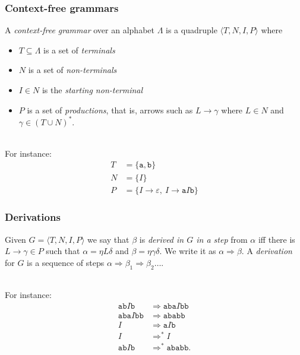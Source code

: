 \documentclass[11pt]{beamer}  %
\begin{document}
\begin{frame}\frametitle{Context-free grammars}

\begin{greenbox}{}
A \emph{context-free grammar} over an alphabet $\Lambda$
is a quadruple $\langle T,N,I,P\rangle$ where
\begin{itemize}
\item $T\subseteq\Lambda$
      is a set of \emph{terminals}
\item $N$ is a set of \emph{non-terminals}
\item $I\in N$ is the \emph{starting non-terminal}
\item $P$ is a set of \emph{productions}, that is, arrows such as
      $L\to\gamma$ where $L\in N$ and $\gamma\in (T\cup N)^*$.
\end{itemize}
\end{greenbox}

\mbox{}\\

For instance:
%
\[
\begin{split}
  T &= \{\mathtt{a},\mathtt{b}\}\\
  N &= \{I\}\\
  P &= \{I\to\varepsilon,\ I\to\mathtt{a}I\mathtt{b}\}
\end{split}
\]

\end{frame}

\begin{frame}\frametitle{Derivations}

\begin{greenbox}{}
Given $G=\langle T,N,I,P\rangle$ we say that
$\beta$ is
\emph{derived in $G$ in a step}
from $\alpha$ iff there is
$L\to\gamma\in P$ such that $\alpha=\eta L\delta$ and $\beta=\eta\gamma\delta$.
We write it as $\alpha\Rightarrow\beta$.
A \emph{derivation} for $G$ is a sequence of steps
$\alpha\Rightarrow\beta_1\Rightarrow\beta_2\ldots$.
\end{greenbox}

\mbox{}\\

For instance:
%
\begin{align*}
  \mathtt{ab}I\mathtt{b}&\Rightarrow\mathtt{aba}I\mathtt{bb}\\
  \mathtt{aba}I\mathtt{bb}&\Rightarrow\mathtt{ababb}\\
  I&\Rightarrow\mathtt{a}I\mathtt{b}\\
  I&\Rightarrow^*I\\
  \mathtt{ab}I\mathtt{b}&\Rightarrow^*\mathtt{ababb}.
\end{align*}

\end{frame}
\end{document}
